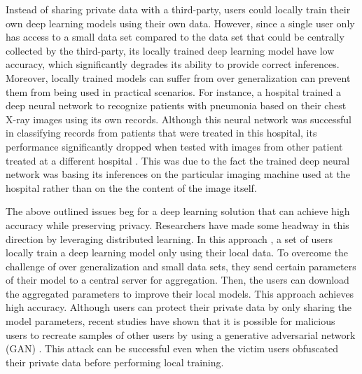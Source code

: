 \documentclass[letterpaper]{article}
\begin{document}
\begin{flushleft}
{Instead of sharing private data with a third-party, users could locally train their own deep learning models using their own
data. However, since a single user only has access to a small data set compared to the data set that could be centrally
collected by the third-party, its locally trained deep learning model have low accuracy, which
significantly degrades its ability to provide correct inferences. 
Moreover, locally trained models can suffer from over generalization can prevent them from being used in practical scenarios.
For instance, a hospital trained a deep neural network to recognize patients with pneumonia based on their
chest X-ray images using its own records. Although this neural network was successful in classifying records from patients that were
treated in this hospital, its performance significantly dropped when tested with images from other patient treated at a different
hospital \cite{zech2018variable}. This was due to the fact the trained deep neural network was basing its inferences on the
particular imaging machine used at the hospital  rather than on the the content of the image itself.
 
The above outlined issues beg for a deep learning solution that can achieve high accuracy while preserving privacy. 
Researchers have made some headway in this direction by leveraging distributed learning.
In this approach  \cite{shokri2015privacy},  a set of users locally
train a deep learning model only using their local data. To overcome the challenge of over generalization and small
data sets, they send certain parameters of their model to a central server for aggregation. 
Then, the users can download the aggregated parameters to improve their local models. This approach achieves high accuracy.
Although users can protect their private data by only sharing the model parameters, recent studies have
shown that it is possible for malicious users to recreate samples of other users by using a generative
adversarial network (GAN) \cite{hitaj2017deep}. This attack can be successful even when the victim users 
obfuscated their private data before performing  local training. 

}
\end{flushleft}
\end{document}

